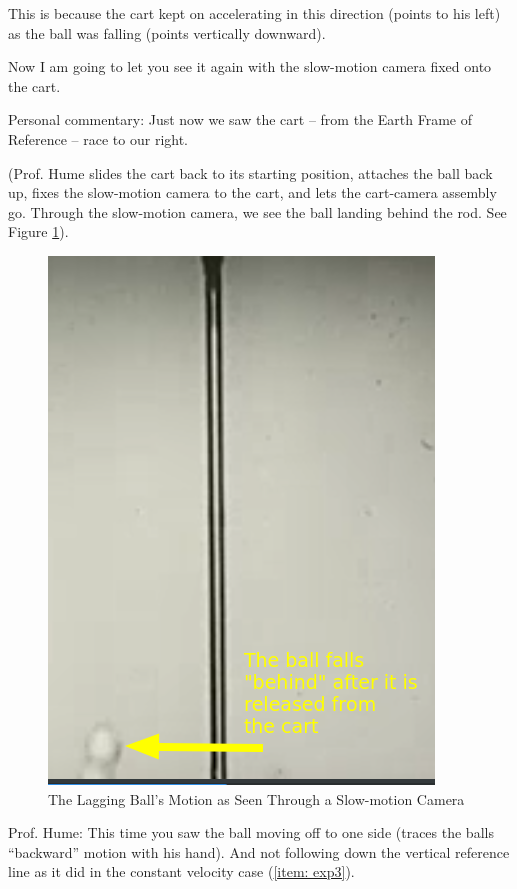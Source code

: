 \documentclass[a6paper]{article}
\begin{document}
This is because the cart kept on accelerating in this direction (points to his left) as the ball was falling (points vertically downward).

Now I am going to let you see it again with the slow-motion camera fixed onto the cart.

Personal commentary: Just now we saw the cart -- from the Earth Frame of Reference -- race to our right. 

(Prof. Hume slides the cart back to its starting position, attaches the ball back up, fixes the slow-motion camera to the cart, and lets the cart-camera assembly go. Through the slow-motion camera, we see the ball landing behind the rod. See Figure \ref{fig: detached-ball-lands-behind-an-accelerating-cart}).

\begin{figure}
    \centering
    \includegraphics[width=0.7\linewidth]{detached-ball-lands-behind-an-accelerating-cart.png}
    \caption{The Lagging Ball's Motion as Seen Through a Slow-motion Camera}
    \label{fig: detached-ball-lands-behind-an-accelerating-cart}
\end{figure}

Prof. Hume: This time you saw the ball moving off to one side (traces the balls ``backward'' motion with his hand). And not following down the vertical reference line as it did in the constant velocity case (\ref{item: exp3}).
\end{document}
